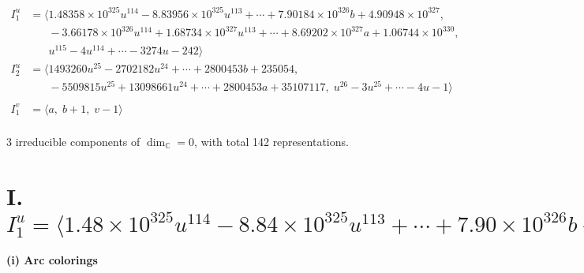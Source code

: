 \documentclass[1p]{elsarticle_modified}
\theoremstyle{definition}
\begin{document}
\begin{align*}
I^u_{1}&=\langle 
1.48358\times10^{325} u^{114}-8.83956\times10^{325} u^{113}+\cdots+7.90184\times10^{326} b+4.90948\times10^{327},\\
\phantom{I^u_{1}}&\phantom{= \langle  }-3.66178\times10^{326} u^{114}+1.68734\times10^{327} u^{113}+\cdots+8.69202\times10^{327} a+1.06744\times10^{330},\\
\phantom{I^u_{1}}&\phantom{= \langle  }u^{115}-4 u^{114}+\cdots-3274 u-242\rangle \\
I^u_{2}&=\langle 
1493260 u^{25}-2702182 u^{24}+\cdots+2800453 b+235054,\\
\phantom{I^u_{2}}&\phantom{= \langle  }-5509815 u^{25}+13098661 u^{24}+\cdots+2800453 a+35107117,\;u^{26}-3 u^{25}+\cdots-4 u-1\rangle \\
\\
I^v_{1}&=\langle 
a,\;b+1,\;v-1\rangle \\
\end{align*}
\raggedright * 3 irreducible components of $\dim_{\mathbb{C}}=0$, with total 142 representations.\\
\newpage
\renewcommand{\arraystretch}{1}
\centering \section*{I. $I^u_{1}= \langle 1.48\times10^{325} u^{114}-8.84\times10^{325} u^{113}+\cdots+7.90\times10^{326} b+4.91\times10^{327},\;-3.66\times10^{326} u^{114}+1.69\times10^{327} u^{113}+\cdots+8.69\times10^{327} a+1.07\times10^{330},\;u^{115}-4 u^{114}+\cdots-3274 u-242 \rangle$}
\flushleft \textbf{(i) Arc colorings}\\
\end{document}
